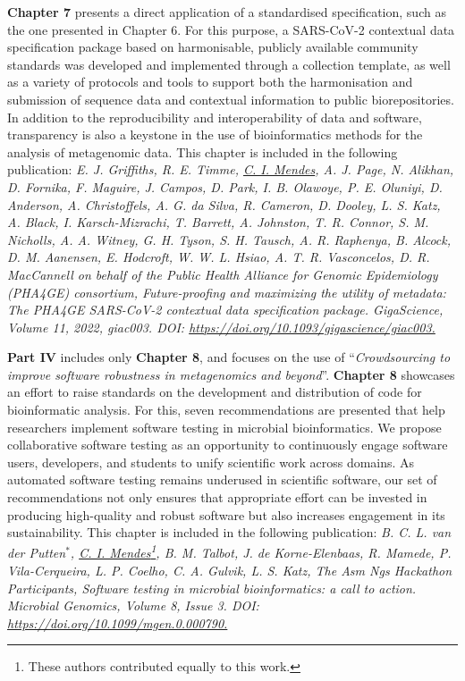 \textbf{Chapter 7} presents a direct application of a standardised specification, such as the one presented in Chapter 6. For this purpose, a SARS-CoV-2 contextual data specification package based on harmonisable, publicly available community standards was developed and implemented through a collection template, as well as a variety of protocols and tools to support both the harmonisation and submission of sequence data and contextual information to public biorepositories. In addition to the reproducibility and interoperability of data and software, transparency is also a keystone in the use of bioinformatics methods for the analysis of metagenomic data. This chapter is included in the following publication: \textit{E. J. Griffiths, R. E. Timme, \underline{C. I. Mendes}, A. J. Page, N. Alikhan, D. Fornika, F. Maguire, J. Campos, D. Park, I. B. Olawoye, P. E. Oluniyi, D. Anderson, A. Christoffels, A. G. da Silva, R. Cameron, D. Dooley, L. S. Katz, A. Black, I. Karsch-Mizrachi, T. Barrett, A. Johnston, T. R. Connor, S. M. Nicholls, A. A. Witney, G. H. Tyson, S. H. Tausch, A. R. Raphenya, B. Alcock, D. M. Aanensen, E. Hodcroft, W. W. L. Hsiao, A. T. R. Vasconcelos, D. R. MacCannell on behalf of the Public Health Alliance for Genomic Epidemiology (PHA4GE) consortium, Future-proofing and maximizing the utility of metadata: The PHA4GE SARS-CoV-2 contextual data specification package. GigaScience, Volume 11, 2022, giac003. DOI: \url{https://doi.org/10.1093/gigascience/giac003.}} 

\textbf{Part IV} includes only \textbf{Chapter 8}, and focuses on the use of “\textit{Crowdsourcing to improve software robustness in metagenomics and beyond}”. \textbf{Chapter 8} showcases an effort to raise standards on the development and distribution of code for bioinformatic analysis. For this, seven recommendations are presented that help researchers implement software testing in microbial bioinformatics. We propose collaborative software testing as an opportunity to continuously engage software users, developers, and students to unify scientific work across domains. As automated software testing remains underused in scientific software, our set of recommendations not only ensures that appropriate effort can be invested in producing high-quality and robust software but also increases engagement in its sustainability. This chapter is included in the following publication: \textit{B. C. L. van der Putten$^*$, \underline{C. I. Mendes}\footnote[1]{These authors contributed equally to this work.}, B. M. Talbot, J. de Korne-Elenbaas, R. Mamede, P. Vila-Cerqueira, L. P. Coelho, C. A. Gulvik, L. S. Katz, The Asm Ngs Hackathon Participants, Software testing in microbial bioinformatics: a call to action. Microbial Genomics, Volume 8, Issue 3. DOI: \url{https://doi.org/10.1099/mgen.0.000790.}}

